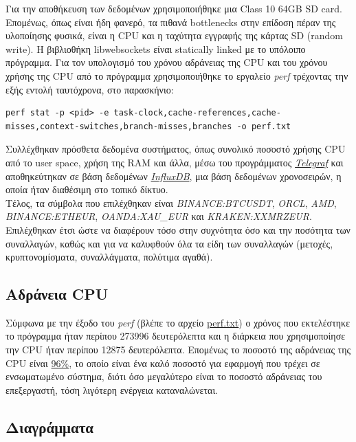 \documentclass[11pt]{article}
\begin{document}
Για την αποθήκευση των δεδομένων χρησιμοποιήθηκε μια Class 10 64GB SD card. Επομένως, όπως είναι ήδη φανερό, τα πιθανά bottlenecks στην επίδοση πέραν της υλοποίησης φυσικά, είναι η CPU και η ταχύτητα εγγραφής της κάρτας SD (random write). Η βιβλιοθήκη libwebsockets είναι statically linked με το υπόλοιπο πρόγραμμα. Για τον υπολογισμό του χρόνου αδράνειας της CPU και του χρόνου χρήσης της CPU από το πρόγραμμα χρησιμοποιήθηκε το εργαλείο \emph{perf}\autocite{sites:perf-wiki} τρέχοντας την εξής εντολή ταυτόχρονα, στο παρασκήνιο:

\begin{verbatim}
perf stat -p <pid> -e task-clock,cache-references,cache-misses,context-switches,branch-misses,branches -o perf.txt
\end{verbatim}


Συλλέχθηκαν πρόσθετα δεδομένα συστήματος, όπως συνολικό ποσοστό χρήσης CPU από το user space, χρήση της RAM και άλλα, μέσω του προγράμματος \href{https://www.influxdata.com/time-series-platform/telegraf/}{\emph{Telegraf}} και αποθηκεύτηκαν σε βάση δεδομένων \href{https://www.influxdata.com}{\emph{InfluxDB}}, μια βάση δεδομένων χρονοσειρών, η οποία ήταν διαθέσιμη στο τοπικό δίκτυο. \\

Τέλος, τα σύμβολα που επιλέχθηκαν είναι \emph{BINANCE:BTCUSDT}, \emph{ORCL}, \emph{AMD}, \emph{BINANCE:ETHEUR}, \emph{OANDA:XAU\_EUR} και \emph{KRAKEN:XXMRZEUR}. Επιλέχθηκαν έτσι ώστε να διαφέρουν τόσο στην συχνότητα όσο και την ποσότητα των συναλλαγών, καθώς και για να καλυφθούν όλα τα είδη των συναλλαγών (μετοχές, κρυπτονομίσματα, συναλλάγματα, πολύτιμα αγαθά).

\pagebreak
\subsection{Αδράνεια CPU}
\label{sec:orgd36ae6f}
Σύμφωνα με την έξοδο του \emph{perf} (βλέπε το αρχείο \href{https://github.com/thetonk/tradestats/blob/main/report/perf.txt}{perf.txt}) ο χρόνος που εκτελέστηκε το πρόγραμμα ήταν περίπου 273996 δευτερόλεπτα και η διάρκεια που χρησιμοποίησε την CPU ήταν περίπου 12875 δευτερόλεπτα. Επομένως το ποσοστό της αδράνειας της CPU είναι \uline{96\%}, το οποίο είναι ένα καλό ποσοστό για εφαρμογή που τρέχει σε ενσωματωμένο σύστημα, διότι όσο μεγαλύτερο είναι το ποσοστό αδράνειας του επεξεργαστή, τόση λιγότερη ενέργεια καταναλώνεται\autocite{inproceedings:power-usage}.
\subsection{Διαγράμματα}
\label{sec:org8dc41f4}
\end{document}
